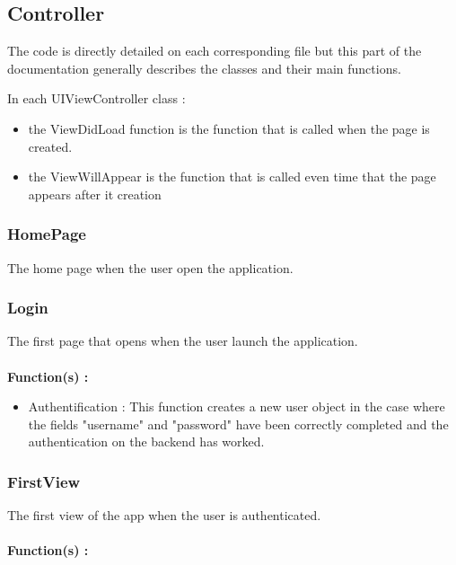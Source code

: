 \subsection{Controller}

The code is directly detailed on each corresponding file but this part of the documentation generally describes the classes and their main functions.

In each UIViewController class :

\begin{itemize}
\item the ViewDidLoad function is the function that is called when the page is created.
\item the ViewWillAppear is the function that is called even time that the page appears after it creation
\end{itemize}

\subsubsection{HomePage}

The home page when the user open the application.

\subsubsection{Login}

The first page that opens when the user launch the application.
\\\\
\textbf{Function(s) :}

\begin{itemize}
\item Authentification : This function creates a new user object in the case where the fields "username" and "password" have been correctly completed and the authentication on the backend has 	worked.
\end{itemize}

\subsubsection{FirstView}

The first view of the app when the user is authenticated.
\\\\
\textbf{Function(s) :}

